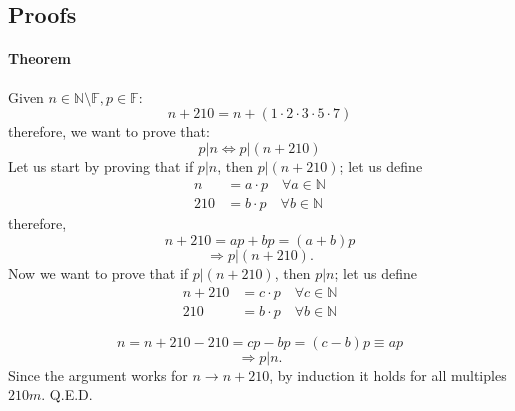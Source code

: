 \documentclass{article}
\begin{document}
\subsection{Proofs}
\paragraph{Theorem} Given $n\in \mathbb{N} \setminus \mathbb{F}, p\in\mathbb{F}$:
$$
n+210=n+(1\cdot2\cdot 3 \cdot 5 \cdot 7)
$$
therefore, we want to prove that:
$$
p|n\Leftrightarrow p|(n+210)
$$
Let us start by proving that if $p|n$, then $p|(n+210)$; let us define
\begin{align*}
n &= a\cdot p \quad \forall a\in\mathbb{N} \\
210 &= b\cdot p \quad \forall b\in\mathbb{N}
\end{align*}
therefore,
$$
n+210=ap+bp=(a+b)p
$$
$$ \Rightarrow p|(n+210). $$
Now we want to prove that if $p|(n+210)$, then $p|n$; let us define 
\begin{align*}
n + 210 &= c\cdot p \quad \forall c\in\mathbb{N} \\
210 &= b\cdot p \quad \forall b\in\mathbb{N}
\end{align*}

$$
n = n+210-210=cp-bp = (c-b)p \equiv ap
$$
$$ \Rightarrow p|n. $$
Since the argument works for $n\rightarrow n+210$, by induction it holds for all multiples $210m$. Q.E.D.
\end{document}
